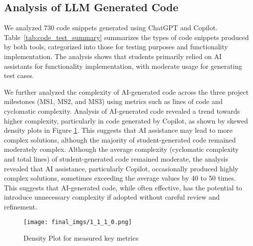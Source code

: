 





\subsection{Analysis of LLM Generated Code}

We analyzed 730 code snippets generated using ChatGPT and Copilot. Table~\ref{tab:code_test_summary} summarizes the types of code snippets produced by both tools, categorized into those for testing purposes and functionality implementation. The analysis shows that students primarily relied on AI assistants for functionality implementation, with moderate usage for generating test cases.



We further analyzed the complexity of AI-generated code across the three project milestones (MS1, MS2, and MS3) using metrics such as lines of code and cyclomatic complexity. Analysis of AI-generated code revealed a trend towards higher complexity, particularly in code generated by Copilot, as shown by skewed density plots in Figure \ref{fig:fig1.1.1}. This suggests that AI assistance may lead to more complex solutions, although the majority of student-generated code remained moderately complex. Although the average complexity (cyclomatic complexity and total lines) of student-generated code remained moderate, the analysis revealed that AI assistance, particularly Copilot, occasionally produced highly complex solutions, sometimes exceeding the average values by 40 to 50 times. This suggests that AI-generated code, while often effective, has the potential to introduce unnecessary complexity if adopted without careful review and refinement.


\begin{figure}[b]
    \centering
    \texttt{[image: final\_imgs/1\_1\_1\_0.png]}
    \caption{Density Plot for measured key metrics}
    \label{fig:fig1.1.1}
\end{figure}

